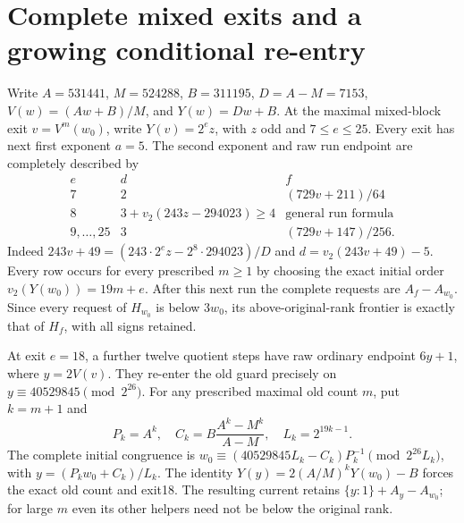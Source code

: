 \documentclass[11pt]{article}
\begin{document}
\section{Complete mixed exits and a growing conditional re-entry}
\label{sec:mixedexit}
Write $A=531441$, $M=524288$, $B=311195$, $D=A-M=7153$,
$V(w)=(Aw+B)/M$, and $Y(w)=Dw+B$. At the maximal mixed-block
exit $v=V^m(w_0)$, write $Y(v)=2^e z$, with $z$ odd and $7\leq e\leq25$.
Every exit has next first exponent $a=5$. The second exponent and raw
run endpoint are completely described by
\[
\begin{array}{c|c|c}
 e&d&f\\\hline
 7&2&(729v+211)/64\\
 8&3+v_2(243z-294023)\geq4&\text{general run formula}\\
 9,\ldots,25&3&(729v+147)/256.
\end{array}
\]
Indeed $243v+49=(243\cdot2^ez-2^8\cdot294023)/D$ and
$d=v_2(243v+49)-5$. Every row occurs for every prescribed $m\geq1$
by choosing the exact initial order $v_2(Y(w_0))=19m+e$.
After this next run the complete requests are $A_f-A_{w_0}$.
Since every request of $H_{w_0}$ is below $3w_0$, its above-original-rank
frontier is exactly that of $H_f$, with all signs retained.

At exit $e=18$, a further twelve quotient steps have raw ordinary
endpoint $6y+1$, where $y=2V(v)$. They re-enter the old guard precisely
on $y\equiv40529845\pmod {2^{26}}$. For any prescribed maximal old
count $m$, put $k=m+1$ and
\[
 P_k=A^k,\quad C_k=B\frac{A^k-M^k}{A-M},\quad L_k=2^{19k-1}.
\]
The complete initial congruence is
$w_0\equiv(40529845L_k-C_k)P_k^{-1}\pmod {2^{26}L_k}$,
with $y=(P_kw_0+C_k)/L_k$. The identity
$Y(y)=2(A/M)^kY(w_0)-B$ forces the exact old count and exit18.
The resulting current retains $\{y:1\}+A_y-A_{w_0}$; for large $m$
even its other helpers need not be below the original rank.
\end{document}
